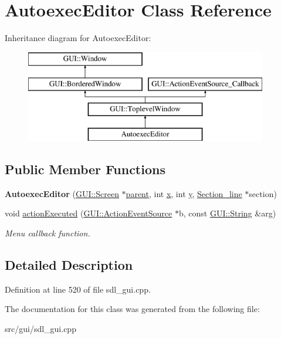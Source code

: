 \hypertarget{classAutoexecEditor}{\section{Autoexec\-Editor Class Reference}
\label{classAutoexecEditor}
}
Inheritance diagram for Autoexec\-Editor\-:\begin{figure}[H]
\begin{center}
\leavevmode
\includegraphics[height=4.000000cm]{classAutoexecEditor}
\end{center}
\end{figure}
\subsection*{Public Member Functions}
\begin{DoxyCompactItemize}
\item 
\hypertarget{classAutoexecEditor_ae2c55e6e3715432d9c394f1dec2f4255}{{\bfseries Autoexec\-Editor} (\hyperlink{classGUI_1_1Screen}{G\-U\-I\-::\-Screen} $\ast$\hyperlink{classGUI_1_1Window_a2e593ff65e7702178d82fe9010a0b539}{parent}, int \hyperlink{classGUI_1_1Window_a6ca6a80ca00c9e1d8ceea8d3d99a657d}{x}, int \hyperlink{classGUI_1_1Window_a0ee8e923aff2c3661fc2e17656d37adf}{y}, \hyperlink{classSection__line}{Section\-\_\-line} $\ast$section)}\label{classAutoexecEditor_ae2c55e6e3715432d9c394f1dec2f4255}

\item 
\hypertarget{classAutoexecEditor_a5103a2bb5e750230a808ce091448ed05}{void \hyperlink{classAutoexecEditor_a5103a2bb5e750230a808ce091448ed05}{action\-Executed} (\hyperlink{classGUI_1_1ActionEventSource}{G\-U\-I\-::\-Action\-Event\-Source} $\ast$b, const \hyperlink{classGUI_1_1String}{G\-U\-I\-::\-String} \&arg)}\label{classAutoexecEditor_a5103a2bb5e750230a808ce091448ed05}

\begin{DoxyCompactList}\small\item\em Menu callback function. \end{DoxyCompactList}\end{DoxyCompactItemize}


\subsection{Detailed Description}


Definition at line 520 of file sdl\-\_\-gui.\-cpp.



The documentation for this class was generated from the following file\-:\begin{DoxyCompactItemize}
\item 
src/gui/sdl\-\_\-gui.\-cpp\end{DoxyCompactItemize}

